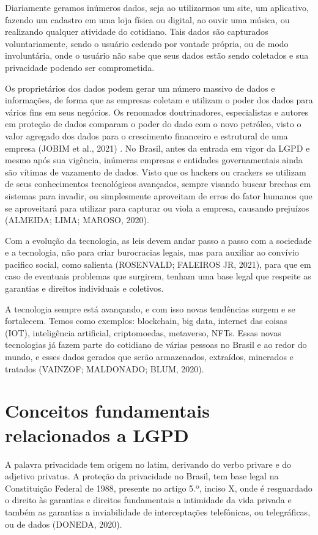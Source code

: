 \documentclass[
	12pt,				%
	openright,			%
	oneside,			%
	a4paper,			%
	english,			%
	french,				%
	spanish,			%
	brazil,				%
	]{abntex2}
\begin{document}
Diariamente geramos inúmeros dados, seja ao utilizarmos um site, um aplicativo, fazendo um cadastro em uma loja física ou digital, ao ouvir uma música, ou realizando qualquer atividade do cotidiano. Tais dados são capturados voluntariamente, sendo o usuário cedendo por vontade própria, ou de modo involuntária, onde o usuário não sabe que seus dados estão sendo coletados e sua privacidade podendo ser comprometida. 

Os proprietários dos dados podem gerar um número massivo de dados e informações, de forma que as empresas coletam e utilizam o poder dos dados para vários fins em seus negócios. Os renomados doutrinadores, especialistas e autores em proteção de dados comparam o poder do dado com o novo petróleo, visto o valor agregado dos dados para o crescimento financeiro e estrutural de uma empresa (JOBIM et al., 2021) . 
No Brasil, antes da entrada em vigor da LGPD e mesmo após sua vigência, inúmeras empresas e entidades governamentais ainda são vítimas de vazamento de dados. Visto que os hackers ou crackers se utilizam de seus conhecimentos tecnológicos avançados, sempre visando buscar brechas em sistemas para invadir, ou simplesmente aproveitam de erros do fator humanos que se aproveitará para utilizar para capturar ou viola a empresa, causando prejuízos (ALMEIDA; LIMA; MAROSO, 2020).

Com a evolução da tecnologia, as leis devem andar passo a passo com a sociedade e a tecnologia, não para criar burocracias legais, mas para auxiliar ao convívio pacifico social, como salienta (ROSENVALD; FALEIROS JR, 2021), para que em caso de eventuais problemas que surgirem, tenham uma base legal que respeite as garantias e direitos individuais e coletivos. 

A tecnologia sempre está avançando, e com isso novas tendências surgem e se fortalecem. Temos como exemplos: blockchain, big data, internet das coisas (IOT), inteligência artificial, criptomoedas, metaverso, NFTs. Essas novas tecnologias já fazem parte do cotidiano de várias pessoas no Brasil e ao redor do mundo, e esses dados gerados que serão armazenados, extraídos, minerados e tratados (VAINZOF; MALDONADO; BLUM, 2020).

\section{Conceitos fundamentais relacionados a LGPD }
A palavra privacidade tem origem no latim, derivando do verbo privare e do adjetivo privatus. A proteção da privacidade no Brasil, tem base legal na Constituição Federal de 1988, presente no artigo 5.º, inciso X, onde é resguardado o direito às garantias e direitos fundamentais a intimidade da vida privada e também as garantias a inviabilidade de interceptações telefônicas, ou telegráficas, ou de dados (DONEDA, 2020).
\end{document}
